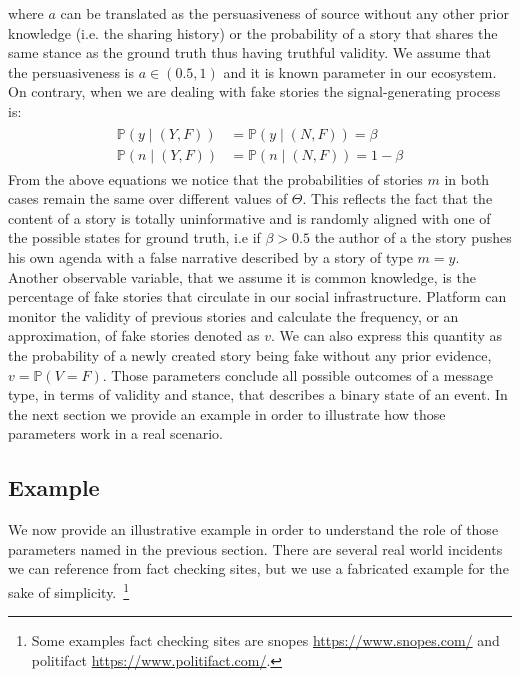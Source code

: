where $a$ can be translated as the persuasiveness of source without any other prior knowledge (i.e. the sharing history) or the probability of a story that shares the same stance as the ground truth thus having truthful validity. We assume that the persuasiveness is $a \in (0.5,1)$ and it is known parameter in our ecosystem. On contrary, when we are dealing with fake stories the signal-generating process is:
\begin{align}
	\begin{split}
		\mathbb{P} ( y \mid (Y,F)) &= \mathbb{P} ( y \mid(N,F)) =\beta \\
		\mathbb{P} ( n \mid (Y,F)) &= \mathbb{P} ( n \mid(N,F)) =1-\beta
	\end{split}
\end{align}
From the above equations we notice that the probabilities of stories $m$ in both cases remain the same over different values of $\Theta$. This reflects the fact that the content of a story is totally uninformative and is randomly aligned with one of the possible states for ground truth, i.e if $\beta > 0.5$ the author of a the story pushes his own agenda with a false narrative described by a story of type $m=y$. Another observable variable, that we assume it is common knowledge, is the percentage of fake stories that circulate in our social infrastructure. Platform can monitor the validity of previous stories and calculate the frequency, or an approximation, of fake stories denoted as $v$. We can also express this quantity as the probability of a newly created story being fake without any prior evidence, $v= \mathbb{P} ( V=F )$. Those parameters conclude all possible outcomes of a message type, in terms of validity and stance, that describes a binary state of an event. In the next section we provide an example in order to illustrate how those parameters work in a real scenario.

\subsection{Example}
\label{subsec:exmpl}

We now provide an illustrative example in order to understand the role of those parameters named in the previous section. There are several real world incidents we can reference from fact checking sites, but we use a fabricated example for the sake of simplicity.~\footnote{Some examples fact checking sites are snopes \url{https://www.snopes.com/} and politifact \url{https://www.politifact.com/}.}

